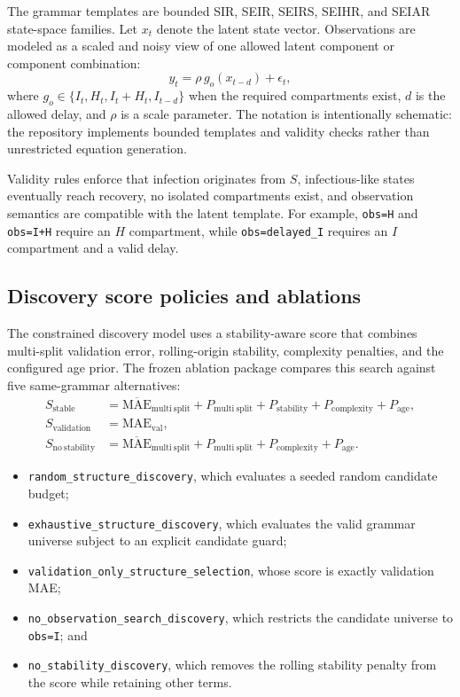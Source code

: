The grammar templates are bounded SIR, SEIR, SEIRS, SEIHR, and SEIAR
state-space families. Let $x_t$ denote the latent state vector. Observations
are modeled as a scaled and noisy view of one allowed latent component or
component combination:
\[
y_t = \rho\, g_o(x_{t-d}) + \epsilon_t,
\]
where $g_o \in \{I_t, H_t, I_t + H_t, I_{t-d}\}$ when the required
compartments exist, $d$ is the allowed delay, and $\rho$ is a scale parameter.
The notation is intentionally schematic: the repository implements bounded
templates and validity checks rather than unrestricted equation generation.

Validity rules enforce that infection originates from $S$, infectious-like
states eventually reach recovery, no isolated compartments exist, and
observation semantics are compatible with the latent template. For example,
\texttt{obs=H} and \texttt{obs=I+H} require an $H$ compartment, while
\texttt{obs=delayed\_I} requires an $I$ compartment and a valid delay.

\subsection{Discovery score policies and ablations}

The constrained discovery model uses a stability-aware score that combines
multi-split validation error, rolling-origin stability, complexity penalties,
and the configured age prior. The frozen ablation package compares this search
against five same-grammar alternatives:
\[
\begin{aligned}
S_{\mathrm{stable}} &=
\overline{\mathrm{MAE}}_{\mathrm{multi\ split}} +
P_{\mathrm{multi\ split}} +
P_{\mathrm{stability}} +
P_{\mathrm{complexity}} +
P_{\mathrm{age}},\\
S_{\mathrm{validation}} &= \mathrm{MAE}_{\mathrm{val}},\\
S_{\mathrm{no\ stability}} &=
\overline{\mathrm{MAE}}_{\mathrm{multi\ split}} +
P_{\mathrm{multi\ split}} +
P_{\mathrm{complexity}} +
P_{\mathrm{age}}.
\end{aligned}
\]
\begin{itemize}[leftmargin=1.5em]
\item \texttt{random\_structure\_discovery}, which evaluates a seeded random
candidate budget;
\item \texttt{exhaustive\_structure\_discovery}, which evaluates the valid
grammar universe subject to an explicit candidate guard;
\item \texttt{validation\_only\_structure\_selection}, whose score is exactly
validation MAE;
\item \texttt{no\_observation\_search\_discovery}, which restricts the
candidate universe to \texttt{obs=I}; and
\item \texttt{no\_stability\_discovery}, which removes the rolling stability
penalty from the score while retaining other terms.
\end{itemize}

